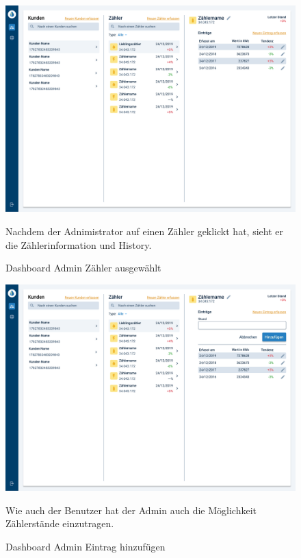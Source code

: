 \newpage

\begin{figure}[h]
	\centering
    \includegraphics[scale=0.3]{img/WebsiteMockup/Dashboard-Admin-ZahlerSelected}
	\caption{Dashboard Admin Zähler ausgewählt} \hfill \break
	Nachdem der Adnimistrator auf einen Zähler geklickt hat, sieht er die Zählerinformation und History.
\end{figure}

\newpage

\begin{figure}[h]
	\centering
    \includegraphics[scale=0.3]{img/WebsiteMockup/Dashboard-Admin-AddEntry}
	\caption{Dashboard Admin Eintrag hinzufügen} \hfill \break
	Wie auch der Benutzer hat der Admin auch die Möglichkeit Zählerstände einzutragen.
\end{figure}

